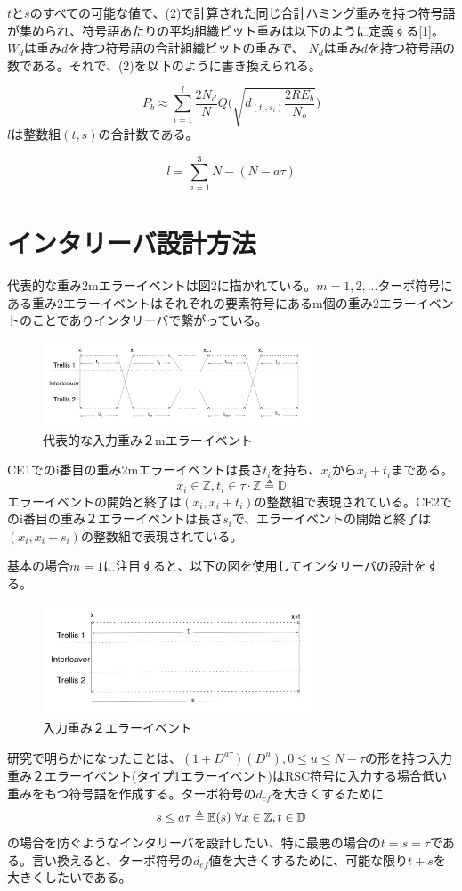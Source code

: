\documentclass[twoside]{jsarticle}
\begin{document}
$t$と$s$のすべての可能な値で、(2)で計算された同じ合計ハミング重みを持つ符号語が集められ、符号語あたりの平均組織ビット重みは以下のように定義する[1]。
$W_d$は重み$d$を持つ符号語の合計組織ビットの重みで、 $N_d$は重み$d$を持つ符号語の数である。それで、(2)を以下のように書き換えられる。


\begin{equation}
P_b \approx \sum_{i=1}^{l} \frac{2N_d}{N}Q\Bigg( \sqrt{d_{(t_i,s_i)}\frac{2RE_b}{N_o}}\Bigg)
\end{equation}
$l$は整数組$(t,s)$の合計数である。

$$l=\sum_{a=1}^{3}N-(N-a\tau)$$





\section{インタリーバ設計方法}
代表的な重み2mエラーイベントは図2に描かれている。$m=1,2,...$ターボ符号にある重み2エラーイベントはそれぞれの要素符号にあるm個の重み2エラーイベントのことでありインタリーバで繋がっている。
\begin{figure}[h!]
\includegraphics[width=8cm]{weight2m.jpg}
\caption{代表的な入力重み２mエラーイベント}
\label{}
\end{figure}
CE1でのi番目の重み2mエラーイベントは長さ$t_i$を持ち、$x_i$から$x_i+t_i$まである。\\$$x_i \in \mathbb{Z},  t_i \in \tau \cdot \mathbb{Z} \triangleq \mathbb{D}$$エラーイベントの開始と終了は$(x_i,x_i+t_i)$の整数組で表現されている。CE2でのi番目の重み２エラーイベントは長さ$s_i$で、エラーイベントの開始と終了は$(x_i,x_i+s_i)$の整数組で表現されている。

基本の場合$m=1$に注目すると、以下の図を使用してインタリーバの設計をする。
\begin{figure}[h!]
\includegraphics[width=8cm]{weight2.jpg}
\caption{入力重み２エラーイベント}
\label{}
\end{figure}
研究で明らかになったことは、$(1+D^{a\tau})(D^u) ,0\leq u\leq N-\tau$の形を持つ入力重み２エラーイベント(タイプ1エラーイベント)はRSC符号に入力する場合低い重みをもつ符号語を作成する。ターボ符号の$d_{ef}$を大きくするために$$s \leq a\tau \triangleq \mathbb{E}(s) \\\\\ \forall x \in \mathbb{Z} , t \in \mathbb{D}$$の場合を防ぐようなインタリーバを設計したい、特に最悪の場合の$t = s =\tau$である。言い換えると、ターボ符号の$d_{ef}$値を大きくするために、可能な限り$t+s$を大きくしたいである。
\end{document}
